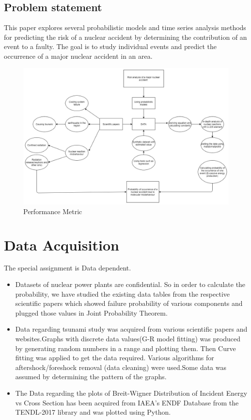 \documentclass{article}
\begin{document}
\subsection{Problem statement}
This paper explores several probabilistic models and time series analysis methods for predicting the risk of a nuclear accident by determining the contribution of an event to a faulty. The goal is to study individual events and predict the occurrence of a major nuclear accident in an area.
\begin{figure}
  \centering
  \includegraphics[scale=0.5]{Metric.jpg}
  \caption{Performance Metric}
  \label{fig:my_label}
\end{figure}

\section{Data Acquisition}
The special assignment is Data dependent.
\begin{itemize}
\item
  Datasets of nuclear power plants are confidential. So in order to calculate the probability, we have studied the existing data tables from the respective scientific papers\cite{cite9} which showed failure probability of various components and plugged those values in Joint Probability Theorem.
\item
  Data regarding tsunami study was acquired from various scientific papers and websites.Graphs with discrete data values(G-R model fitting) was produced by generating random numbers in a range and plotting them. Then Curve fitting was applied to get the data required. Various algorithms for aftershock/foreshock removal (data cleaning)\cite{cite14} were used.Some data was assumed by determining the pattern of the graphs.
\item
  The Data regarding the plots of Breit-Wigner Distribution of Incident Energy vs Cross Section has been acquired from IAEA's ENDF Database from the TENDL-2017 library\cite{cite15} and was plotted using Python.
\end{itemize}
\end{document}
